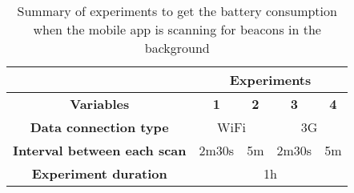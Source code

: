 \begin{table}[]
\centering
\begin{tabular}{@{}|c|c|c|c|c|@{}}
\toprule
\multicolumn{1}{|l|}{}              & \multicolumn{4}{c|}{\textbf{Experiments}}                                                                   \\ \midrule
\textbf{Variables}                  & \textbf{1}                 & \textbf{2}              & \textbf{3}                 & \textbf{4}              \\ \midrule
\textbf{Data connection type}       & \multicolumn{2}{c|}{WiFi}                            & \multicolumn{2}{c|}{3G}                              \\ \midrule
\textbf{Interval between each scan} & \multicolumn{1}{r|}{2m30s} & \multicolumn{1}{r|}{5m} & \multicolumn{1}{r|}{2m30s} & \multicolumn{1}{r|}{5m} \\ \midrule
\textbf{Experiment duration}        & \multicolumn{4}{c|}{1h}                                                                                     \\ \bottomrule
\end{tabular}
\caption[Battery consumption results]{Summary of experiments to get the battery consumption when the mobile
app is scanning for beacons in the background}
\label{tab:experiments_battery}
\end{table}
